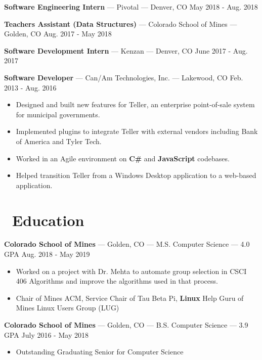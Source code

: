 \documentclass[10pt,letterpaper]{article}
\begin{document}
\textbf{Software Engineering Intern} --- Pivotal --- Denver, CO
\hfill May 2018 - Aug. 2018

\vspace{2pt}
\textbf{Teachers Assistant (Data Structures)} --- Colorado School of Mines ---
Golden, CO \hfill Aug. 2017 - May 2018

\vspace{2pt}
\textbf{Software Development Intern} --- Kenzan --- Denver, CO
\hfill June 2017 - Aug. 2017

\vspace{2pt}
\textbf{Software Developer} --- Can/Am Technologies, Inc. --- Lakewood, CO
\hfill Feb. 2013 - Aug. 2016
\begin{itemize}
    \item Designed and built new features for Teller, an enterprise
        point-of-sale system for municipal governments.
    \item Implemented plugins to integrate Teller with external vendors
        including Bank of America and Tyler Tech.
    \item Worked in an Agile environment on \textbf{C\#} and \textbf{JavaScript}
        codebases.
    \item Helped transition Teller from a Windows Desktop application to a
        web-based application.
\end{itemize}

\section*{\faBook\ Education}
\textbf{Colorado School of Mines} --- Golden, CO --- M.S. Computer Science --- 4.0 GPA
\hfill Aug. 2018 - May 2019
\begin{itemize}
    \item Worked on a project with Dr. Mehta to automate group selection in
        CSCI 406 Algorithms and improve the algorithms used in that process.
    \item Chair of Mines ACM, Service Chair of Tau Beta Pi, \textbf{Linux} Help
        Guru of Mines Linux Users Group (LUG)
\end{itemize}

\textbf{Colorado School of Mines} --- Golden, CO --- B.S. Computer Science --- 3.9 GPA
\hfill July 2016 - May 2018
\begin{itemize}
    \item Outstanding Graduating Senior for Computer Science
\end{itemize}
\end{document}
